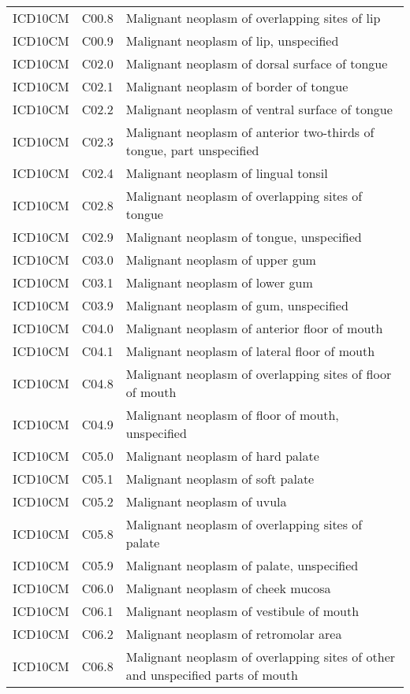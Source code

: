 \begin{longtable}{p{}p{}p{}}
  ICD10CM & C00.8 & Malignant neoplasm of overlapping sites of lip \\ 
  ICD10CM & C00.9 & Malignant neoplasm of lip, unspecified \\ 
  ICD10CM & C02.0 & Malignant neoplasm of dorsal surface of tongue \\ 
  ICD10CM & C02.1 & Malignant neoplasm of border of tongue \\ 
  ICD10CM & C02.2 & Malignant neoplasm of ventral surface of tongue \\ 
  ICD10CM & C02.3 & Malignant neoplasm of anterior two-thirds of tongue, part unspecified \\ 
  ICD10CM & C02.4 & Malignant neoplasm of lingual tonsil \\ 
  ICD10CM & C02.8 & Malignant neoplasm of overlapping sites of tongue \\ 
  ICD10CM & C02.9 & Malignant neoplasm of tongue, unspecified \\ 
  ICD10CM & C03.0 & Malignant neoplasm of upper gum \\ 
  ICD10CM & C03.1 & Malignant neoplasm of lower gum \\ 
  ICD10CM & C03.9 & Malignant neoplasm of gum, unspecified \\ 
  ICD10CM & C04.0 & Malignant neoplasm of anterior floor of mouth \\ 
  ICD10CM & C04.1 & Malignant neoplasm of lateral floor of mouth \\ 
  ICD10CM & C04.8 & Malignant neoplasm of overlapping sites of floor of mouth \\ 
  ICD10CM & C04.9 & Malignant neoplasm of floor of mouth, unspecified \\ 
  ICD10CM & C05.0 & Malignant neoplasm of hard palate \\ 
  ICD10CM & C05.1 & Malignant neoplasm of soft palate \\ 
  ICD10CM & C05.2 & Malignant neoplasm of uvula \\ 
  ICD10CM & C05.8 & Malignant neoplasm of overlapping sites of palate \\ 
  ICD10CM & C05.9 & Malignant neoplasm of palate, unspecified \\ 
  ICD10CM & C06.0 & Malignant neoplasm of cheek mucosa \\ 
  ICD10CM & C06.1 & Malignant neoplasm of vestibule of mouth \\ 
  ICD10CM & C06.2 & Malignant neoplasm of retromolar area \\ 
  ICD10CM & C06.8 & Malignant neoplasm of overlapping sites of other and unspecified parts of mouth \\ 

\end{longtable}
